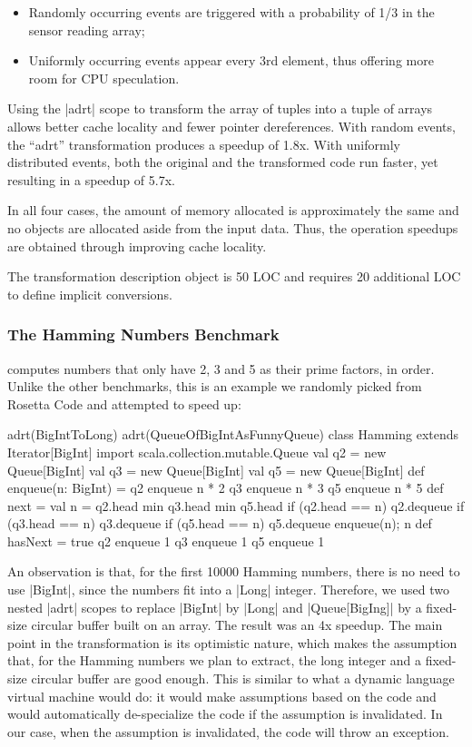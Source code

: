 \begin{itemize}
 \item Randomly occurring events are triggered with a probability of 1/3 in the sensor reading array;
 \item Uniformly occurring events appear every 3rd element, thus offering more room for CPU speculation.
\end{itemize}

Using the |adrt| scope to transform the array of tuples into a tuple of arrays allows better cache locality and fewer pointer dereferences. With random events, the ``adrt'' transformation produces a speedup of 1.8x. With uniformly distributed events, both the original and the transformed code run faster, yet resulting in a speedup of 5.7x.

In all four cases, the amount of memory allocated is approximately the same and no objects are allocated aside from the input data. Thus, the operation speedups are obtained through improving cache locality.

The transformation description object is 50 LOC and requires 20 additional LOC to define implicit conversions.

\subsubsection{The Hamming Numbers Benchmark} computes numbers that only have 2, 3 and 5 as their prime factors, in order. Unlike the other benchmarks, this is an example we randomly picked from Rosetta Code \cite{rosetta-code} and attempted to speed up:

\begin{lstlisting-nobreak}
adrt(BigIntToLong) {
  adrt(QueueOfBigIntAsFunnyQueue) {
    class Hamming extends Iterator[BigInt] {
      import scala.collection.mutable.Queue
      val q2 = new Queue[BigInt]
      val q3 = new Queue[BigInt]
      val q5 = new Queue[BigInt]
      def enqueue(n: BigInt) = {
        q2 enqueue n * 2
        q3 enqueue n * 3
        q5 enqueue n * 5
      }
      def next = {
        val n = q2.head min q3.head min q5.head
        if (q2.head == n) q2.dequeue
        if (q3.head == n) q3.dequeue
        if (q5.head == n) q5.dequeue
        enqueue(n); n
      }
      def hasNext = true
      q2 enqueue 1
      q3 enqueue 1
      q5 enqueue 1
    }
  }
}
\end{lstlisting-nobreak}

An observation is that, for the first 10000 Hamming numbers, there is no need to use |BigInt|, since the numbers fit into a |Long| integer. Therefore, we used two nested |adrt| scopes to replace |BigInt| by |Long| and |Queue[BigIng]| by a fixed-size circular buffer built on an array. The result was an 4x speedup. The main point in the transformation is its optimistic nature, which makes the assumption that, for the Hamming numbers we plan to extract, the long integer and a fixed-size circular buffer are good enough. This is similar to what a dynamic language virtual machine would do: it would make assumptions based on the code and would automatically de-specialize the code if the assumption is invalidated. In our case, when the assumption is invalidated, the code will throw an exception.


